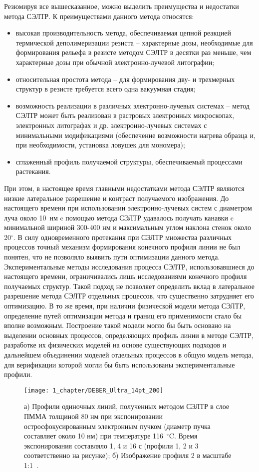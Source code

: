 Резюмируя все вышесказанное, можно выделить преимущества и недостатки метода СЭЛТР. К преимуществами данного метода относятся:
\begin{itemize}
	\item высокая производительность метода, обеспечиваемая цепной реакцией термической деполимеризации резиста -- характерные дозы, необходимые для формирования рельефа в резисте методом СЭЛТР в десятки раз меньше, чем характерные дозы при обычной электронно-лучевой литографии;
	\item относительная простота метода -- для формирования дву- и трехмерных структур в резисте требуется всего одна вакуумная стадия;
	\item возможность реализации в различных электронно-лучевых системах -- метод СЭЛТР может быть реализован в растровых электронных микроскопах, электронных литографах и др. электронно-лучевых системах с минимальными модификациями (обеспечение возможности нагрева образца и, при необходимости, установка ловушек для мономера);
	\item сглаженный профиль получаемой структуры, обеспечиваемый процессами растекания.
\end{itemize}

При этом, в настоящее время главными недостатками метода СЭЛТР являются низкие латеральное разрешение и контраст получаемого изображения. До настоящего времени при использовании электронно-лучевых систем с диаметром луча около 10~нм c помощью метода СЭЛТР удавалось получать канавки c минимальной шириной 300-400 нм и максимальным углом наклона стенок около 20$^\circ$. В силу одновременного протекания при СЭЛТР множества различных процессов точный механизм формирования конечного профиля линии не был понятен, что не позволяло выявить пути оптимизации данного метода. Экспериментальные методы исследования процесса СЭЛТР, использовавшиеся до настоящего времени, ограничивались лишь исследованиями конечного профиля получаемых структур. Такой подход не позволяет определить вклад в латеральное разрешение метода СЭЛТР отдельных процессов, что существенно затрудняет его оптимизацию. В то же время, при наличии физической модели метода СЭЛТР, определение путей оптимизации метода и границ его применимости стало бы вполне возможным. Построение такой модели могло бы быть основано на выделении основных процессов, определяющих профиль линии в методе СЭЛТР, разработке их физических моделей на основе существующих подходов и дальнейшем объединении моделей отдельных процессов в общую модель метода, для верификации которой могли бы быть использованы экспериментальные профили.

\begin{figure}
	\centering
	\texttt{[image: 1\_chapter/DEBER\_Ultra\_14pt\_200]}
	\caption{а) Профили одиночных линий, полученных методом СЭЛТР в слое ПММА толщиной 80 нм при экспонировании остросфокусированным электронным пучком (диаметр пучка составляет около 10 нм) при температуре 116~$^\circ$C. Время экспонирования составляло 1, 4 и 16 с (профили 1, 2 и 3 соответственно на рисунке); б) Изображение профиля 2 в масштабе 1:1~\cite{Bruk_2016_mee}.}
	\label{fig:DEBER_Ultra}
\end{figure}
